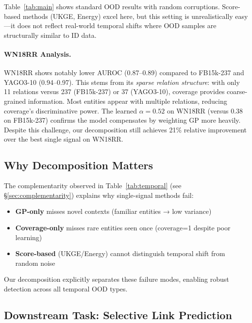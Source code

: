 Table~\ref{tab:main} shows standard OOD results with random corruptions.
Score-based methods (UKGE, Energy) excel here, but this setting is unrealistically easy---it does not reflect real-world temporal shifts where OOD samples are structurally similar to ID data.

\paragraph{WN18RR Analysis.}
WN18RR shows notably lower AUROC (0.87--0.89) compared to FB15k-237 and YAGO3-10 (0.94--0.97).
This stems from its \emph{sparse relation structure}: with only 11 relations versus 237 (FB15k-237) or 37 (YAGO3-10), coverage provides coarse-grained information.
Most entities appear with multiple relations, reducing coverage's discriminative power.
The learned $\alpha = 0.52$ on WN18RR (versus 0.38 on FB15k-237) confirms the model compensates by weighting GP more heavily.
Despite this challenge, our decomposition still achieves 21\% relative improvement over the best single signal on WN18RR.

\subsection{Why Decomposition Matters}

The complementarity observed in Table~\ref{tab:temporal} (see \S\ref{sec:complementarity}) explains why single-signal methods fail:
\begin{itemize}
    \item \textbf{GP-only} misses novel contexts (familiar entities → low variance)
    \item \textbf{Coverage-only} misses rare entities seen once (coverage=1 despite poor learning)
    \item \textbf{Score-based} (UKGE/Energy) cannot distinguish temporal shift from random noise
\end{itemize}

Our decomposition explicitly separates these failure modes, enabling robust detection across all temporal OOD types.

\subsection{Downstream Task: Selective Link Prediction}

